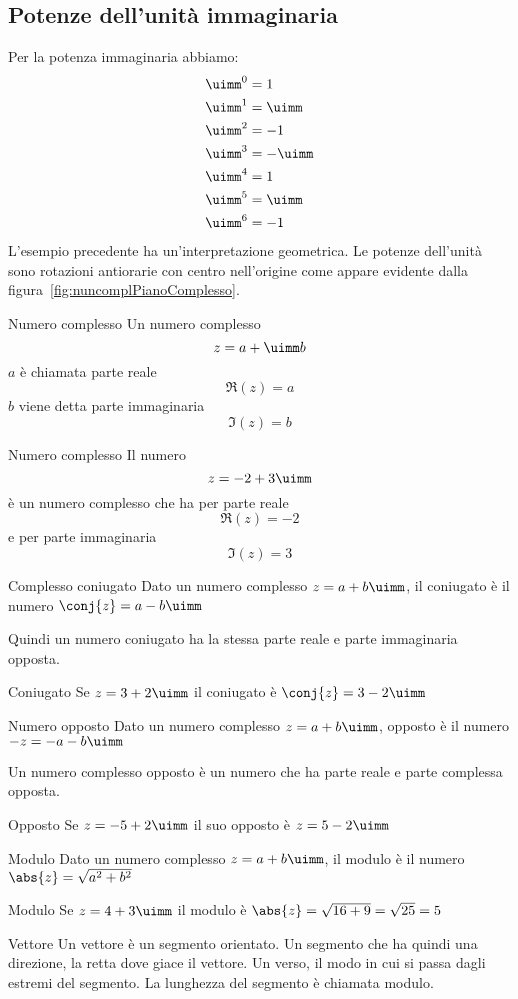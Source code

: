 \subsection{Potenze dell'unità immaginaria}
Per la potenza immaginaria abbiamo:
\begin{align*}
	&\uimm^0=1\\
	&\uimm^1=\uimm\\
	&\uimm^2=-1\\
	&\uimm^3=-\uimm\\
	&\uimm^4=1\\
	&\uimm^5=\uimm\\
	&\uimm^6=-1
\end{align*}
L'esempio precedente ha un'interpretazione geometrica. Le potenze dell'unità sono rotazioni antiorarie  con  centro nell'origine come appare evidente dalla figura~\vref{fig:nuncomplPianoComplesso}.
\begin{definizionet}{Numero complesso}{}
	 Un numero complesso  \[z=a+\uimm b\] $a$ è chiamata parte reale \[\Re\left(z\right)=a\]
	$b$ viene detta  parte immaginaria\[\Im\left(z\right)=b \] 
\end{definizionet}
\begin{esempiot}{Numero complesso}{}
Il numero \[z=-2+3\uimm \] è un numero complesso che ha per parte reale \[\Re(z)=-2\]  e per parte immaginaria \[\Im(z)=3\]
\end{esempiot}
\begin{definizionet}{Complesso coniugato}{}
	Dato un numero complesso $z=a+b\uimm$, il coniugato è  il numero $\conj{z}=a-b\uimm$
\end{definizionet}
Quindi un numero coniugato ha la stessa parte reale e parte immaginaria opposta.
\begin{esempiot}{Coniugato}{}
Se $z=3+2\uimm$ il coniugato è $\conj{z}=3-2\uimm$ 
\end{esempiot}
\begin{definizionet}{Numero opposto}{}
Dato un numero complesso $z=a+b\uimm$,  opposto 
è  il numero $-z=-a-b\uimm$
\end{definizionet}
Un numero complesso opposto è un numero che ha parte reale e parte complessa 
opposta.
\begin{esempiot}{Opposto}{}
	Se $z=-5+2\uimm$ il suo opposto è $z=5-2\uimm$
\end{esempiot}
\begin{definizionet}{Modulo}{}
Dato un numero  complesso $z=a+b\uimm$, il modulo è il numero $\abs{z}=\sqrt{a^2+b^2}$
\end{definizionet}
\begin{esempiot}{Modulo}{}
	Se $z=4+3\uimm$ il modulo è $\abs{z}=\sqrt{16+9}=\sqrt{25}=5$
\end{esempiot}
\begin{definizionet}{Vettore}{}
	Un vettore è un segmento orientato. Un segmento che ha 
	quindi una direzione, la retta dove giace il vettore. Un verso, il modo in 
	cui si passa dagli estremi del segmento. 
	La lunghezza del segmento è chiamata modulo.
\end{definizionet}
